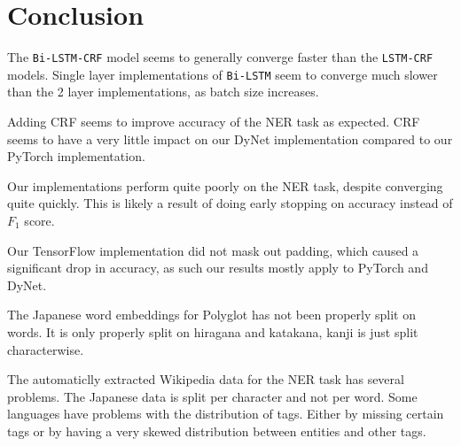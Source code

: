

\section{Conclusion}

The \texttt{Bi-LSTM-CRF} model seems to generally converge faster than the
\texttt{LSTM-CRF} models. Single layer implementations of \texttt{Bi-LSTM}
seem to converge much slower than the 2 layer implementations, as batch size
increases.

Adding CRF seems to improve accuracy of the NER task as expected. CRF seems to
have a very little impact on our DyNet implementation compared to our PyTorch
implementation.

Our implementations perform quite poorly on the NER task, despite converging
quite quickly. This is likely a result of doing early stopping on accuracy
instead of $F_1$ score.

Our TensorFlow implementation did not mask out padding, which caused a
significant drop in accuracy, as such our results mostly apply to PyTorch and
DyNet.

The Japanese word embeddings for Polyglot has not been properly split on words.
It is only properly split on hiragana and katakana, kanji is just split
characterwise.

The automaticlly extracted Wikipedia data for the NER task has several
problems.
The Japanese data is split per character and not per word.
Some languages have problems with the distribution of tags.
Either by missing certain tags or by having a very skewed distribution between
entities and other tags.




